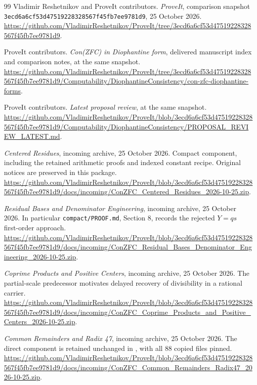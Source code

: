 \documentclass[11pt,letterpaper]{article}
\theoremstyle{definition}
\theoremstyle{remark}
\begin{document}

\endgroup

\clearpage
\begin{thebibliography}{99}
Vladimir Reshetnikov and ProveIt contributors.
\emph{ProveIt}, comparison snapshot
\texttt{3ecd6a6cf53d47519228328567f45fb7ee9781d9}, 25 October 2026.
\url{https://github.com/VladimirReshetnikov/ProveIt/tree/3ecd6a6cf53d47519228328567f45fb7ee9781d9}.

ProveIt contributors. \emph{Con(ZFC) in Diophantine form}, delivered
manuscript index and comparison notes, at the same snapshot.
\url{https://github.com/VladimirReshetnikov/ProveIt/tree/3ecd6a6cf53d47519228328567f45fb7ee9781d9/Computability/DiophantineConsistency/con-zfc-diophantine-forms}.

ProveIt contributors. \emph{Latest proposal review}, at the same snapshot.
\url{https://github.com/VladimirReshetnikov/ProveIt/blob/3ecd6a6cf53d47519228328567f45fb7ee9781d9/Computability/DiophantineConsistency/PROPOSAL_REVIEW_LATEST.md}.

\emph{Centered Residues}, incoming archive, 25 October 2026.
Compact component, including the retained arithmetic proofs and indexed
constant recipe.  Original notices are preserved in this package.
\url{https://github.com/VladimirReshetnikov/ProveIt/blob/3ecd6a6cf53d47519228328567f45fb7ee9781d9/docs/incoming/ConZFC_Centered_Residues_2026-10-25.zip}.

\emph{Residual Bases and Denominator Engineering}, incoming archive,
25 October 2026.  In particular \texttt{compact/PROOF.md}, Section 8,
records the rejected $Y=qs$ first-order approach.
\url{https://github.com/VladimirReshetnikov/ProveIt/blob/3ecd6a6cf53d47519228328567f45fb7ee9781d9/docs/incoming/ConZFC_Residual_Bases_Denominator_Engineering_2026-10-25.zip}.

\emph{Coprime Products and Positive Centers}, incoming archive,
25 October 2026.  The partial-scale predecessor motivates delayed recovery
of divisibility in a rational carrier.
\url{https://github.com/VladimirReshetnikov/ProveIt/blob/3ecd6a6cf53d47519228328567f45fb7ee9781d9/docs/incoming/ConZFC_Coprime_Products_and_Positive_Centers_2026-10-25.zip}.

\emph{Common Remainders and Radix 47}, incoming archive, 25 October 2026.
The direct component is retained unchanged in
, with all $88$ copied files pinned.
\url{https://github.com/VladimirReshetnikov/ProveIt/blob/3ecd6a6cf53d47519228328567f45fb7ee9781d9/docs/incoming/ConZFC_Common_Remainders_Radix47_2026-10-25.zip}.


\end{thebibliography}
\end{document}
